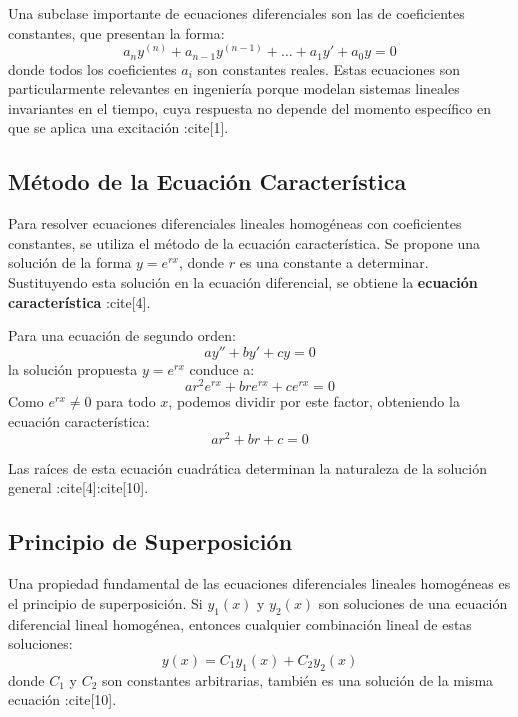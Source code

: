 \documentclass[12pt,a4paper]{article}
\begin{document}
Una subclase importante de ecuaciones diferenciales son las de coeficientes constantes, que presentan la forma:
\begin{equation}
a_n y^{(n)} + a_{n-1} y^{(n-1)} + \ldots + a_1 y' + a_0 y = 0
\end{equation}
donde todos los coeficientes $a_i$ son constantes reales. Estas ecuaciones son particularmente relevantes en ingeniería porque modelan sistemas lineales invariantes en el tiempo, cuya respuesta no depende del momento específico en que se aplica una excitación :cite[1].

\subsection{Método de la Ecuación Característica}

Para resolver ecuaciones diferenciales lineales homogéneas con coeficientes constantes, se utiliza el método de la ecuación característica. Se propone una solución de la forma $y = e^{rx}$, donde $r$ es una constante a determinar. Sustituyendo esta solución en la ecuación diferencial, se obtiene la \textbf{ecuación característica} :cite[4].

Para una ecuación de segundo orden:
\begin{equation}
a y'' + b y' + c y = 0
\end{equation}
la solución propuesta $y = e^{rx}$ conduce a:
\begin{equation}
a r^2 e^{rx} + b r e^{rx} + c e^{rx} = 0
\end{equation}
Como $e^{rx} \neq 0$ para todo $x$, podemos dividir por este factor, obteniendo la ecuación característica:
\begin{equation}
a r^2 + b r + c = 0
\end{equation}

Las raíces de esta ecuación cuadrática determinan la naturaleza de la solución general :cite[4]:cite[10].

\subsection{Principio de Superposición}

Una propiedad fundamental de las ecuaciones diferenciales lineales homogéneas es el principio de superposición. Si $y_1(x)$ y $y_2(x)$ son soluciones de una ecuación diferencial lineal homogénea, entonces cualquier combinación lineal de estas soluciones:
\begin{equation}
y(x) = C_1 y_1(x) + C_2 y_2(x)
\end{equation}
donde $C_1$ y $C_2$ son constantes arbitrarias, también es una solución de la misma ecuación :cite[10].
\end{document}
